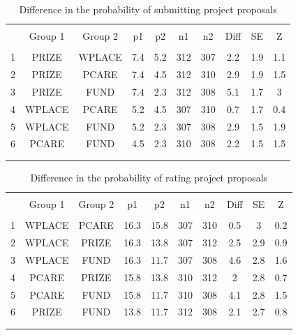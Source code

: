 \documentclass[11pt, titlepage]{article}
\begin{document}
\begin{table}
\centering
\caption{Difference in the probability of submitting project proposals}
\label{app: proposals}
\begin{tabular}{@{}lccccccccc}
  \\[-1.8ex]\hline \hline \\[-1.8ex]
 & Group 1 & Group 2 & p1 & p2 & n1 & n2 & Diff & SE & Z \\ 
  \hline \\[-1.86ex]
1 & PRIZE & WPLACE & 7.4 & 5.2 & 312 & 307 & 2.2 & 1.9 & 1.1 \\ 
  2 & PRIZE & PCARE & 7.4 & 4.5 & 312 & 310 & 2.9 & 1.9 & 1.5 \\ 
  3 & PRIZE & FUND & 7.4 & 2.3 & 312 & 308 & 5.1 & 1.7 & 3 \\ 
  4 & WPLACE & PCARE & 5.2 & 4.5 & 307 & 310 & 0.7 & 1.7 & 0.4 \\ 
  5 & WPLACE & FUND & 5.2 & 2.3 & 307 & 308 & 2.9 & 1.5 & 1.9 \\ 
  6 & PCARE & FUND & 4.5 & 2.3 & 310 & 308 & 2.2 & 1.5 & 1.5 \\ 
   \\[-1.8ex]\hline \hline \\[-1.8ex]
\end{tabular}
\end{table}\begin{table}
\centering
\caption{Difference in the probability of rating project proposals}
\label{app: ratings}
\begin{tabular}{@{}lccccccccc}
  \\[-1.8ex]\hline \hline \\[-1.8ex]
 & Group 1 & Group 2 & p1 & p2 & n1 & n2 & Diff & SE & Z \\ 
  \hline \\[-1.86ex]
1 & WPLACE & PCARE & 16.3 & 15.8 & 307 & 310 & 0.5 & 3 & 0.2 \\ 
  2 & WPLACE & PRIZE & 16.3 & 13.8 & 307 & 312 & 2.5 & 2.9 & 0.9 \\ 
  3 & WPLACE & FUND & 16.3 & 11.7 & 307 & 308 & 4.6 & 2.8 & 1.6 \\ 
  4 & PCARE & PRIZE & 15.8 & 13.8 & 310 & 312 & 2 & 2.8 & 0.7 \\ 
  5 & PCARE & FUND & 15.8 & 11.7 & 310 & 308 & 4.1 & 2.8 & 1.5 \\ 
  6 & PRIZE & FUND & 13.8 & 11.7 & 312 & 308 & 2.1 & 2.7 & 0.8 \\ 
   \\[-1.8ex]\hline \hline \\[-1.8ex]

\end{tabular}
\end{table}
\end{document}
